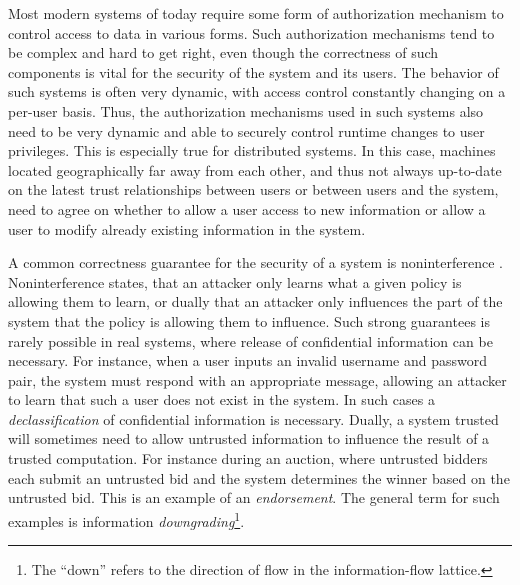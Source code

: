 Most modern systems of today require some form of authorization mechanism to control access to data in various forms. Such authorization mechanisms tend to be complex and hard to get right, even though the correctness of such components is vital for the security of the system and its users. The behavior of such systems is often very dynamic, with access control constantly changing on a per-user basis. Thus, the authorization mechanisms used in such systems also need to be very dynamic and able to securely control runtime changes to user privileges.
This is especially true for distributed systems. In this case, machines located geographically far away from each other, and thus not always up-to-date on the latest trust relationships between users or between users and the system, need to agree on whether to allow a user access to new information or allow a user to modify already existing information in the system.

A common correctness guarantee for the security of a system is noninterference \cite{Cite appropiate NI literature}. Noninterference states, that an attacker only learns what a given policy is allowing them to learn, or dually that an attacker only influences the part of the system that the policy is allowing them to influence. Such strong guarantees is rarely possible in real systems, where release of confidential information can be necessary. For instance, when a user inputs an invalid username and password pair, the system must respond with an appropriate message, allowing an attacker to learn that such a user does not exist in the system. In such cases a \emph{declassification} of confidential information is necessary. Dually, a system trusted will sometimes need to allow untrusted information to influence the result of a trusted computation. For instance during an auction, where untrusted bidders each submit an untrusted bid and the system determines the winner based on the untrusted bid. This is an example of an \emph{endorsement}. The general term for such examples is information \emph{downgrading}\footnote{The ``down'' refers to the direction of flow in the information-flow lattice.}.

